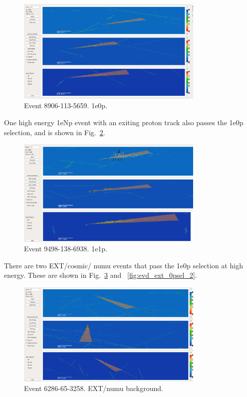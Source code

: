 \begin{figure}[H]
    \centering
    \includegraphics[width=0.8\textwidth]{1e0p/High_E_Sideband/evds/1e0p2_8906_113_5659.pdf}
    \caption{Event 8906-113-5659. 1e0p.}
    \label{fig:evd_1e0p_2}
\end{figure}

One high energy 1eNp event with an exiting proton track also passes the 1e0p selection, and is shown in Fig.~\ref{fig:evd_1eNp_0psel_1}.

\begin{figure}[H]
    \centering
    \includegraphics[width=0.8\textwidth]{1e0p/High_E_Sideband/evds/1eNp_9498_138_6938.pdf}
    \caption{Event 9498-138-6938. 1e1p.}
    \label{fig:evd_1eNp_0psel_1}
\end{figure} 

There are two EXT/cosmic/ numu events that pass the 1e0p selection at high energy.  These are shown in Fig.~\ref{fig:evd_ext_0psel_1} and ~\ref{fig:evd_ext_0psel_2}.

\begin{figure}[H]
    \centering
    \includegraphics[width=0.8\textwidth]{1e0p/High_E_Sideband/evds/ext1_6286_65_3258.pdf}
    \caption{Event 6286-65-3258. EXT/numu background.}
    \label{fig:evd_ext_0psel_1}
\end{figure} 

